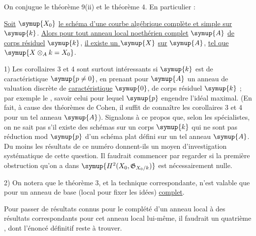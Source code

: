 On conjugue le théorème 9(ii) et le théorème 4. En particulier :

 \uline{Soit} $\symup{X_0}$ \uline{le schéma d'une courbe algébrique complète
et simple sur} $\symup{k}$. \uline{Alors pour tout anneau local noethérien complet} $\symup{A}$ \uline{de corps
résiduel} $\symup{k}$, \uline{il existe un } $\symup{X}$ \uline{sur} $\symup{A}$, \uline{tel que}
$\symup{X\otimes_A k=X_0}$.


1) Les corollaires 3 et 4 sont surtout intéressants si $\symup{k}$ est de
caractéristique $\symup{p\ne0}$, en prenant pour $\symup{A}$ un anneau de valuation discrète de
\uline{caractéristique} $\symup{0}$, de corps résiduel $\symup{k}$ ; par exemple le , savoir celui pour lequel $\symup{p}$ engendre l'idéal maximal. (En fait, à
cause des théorèmes de Cohen, il suffit de connaître les corollaires 3 et 4
pour un tel anneau $\symup{A}$). Signalons à ce propos que, selon les spécialistes, on
ne sait pas s'il existe des schémas sur un corps $\symup{k}$ qui ne sont pas réduction
mod $\symup{p}$ d'un schéma plat défini sur un tel anneau $\symup{A}$. Du moins les résultats
de ce numéro donnent-ils un moyen d'investigation systématique de cette
question. Il faudrait commencer
par regarder si la première obstruction qu'on a dans
$\symup{H^2(X_0,\mathfrak G_{X_0/k})}$ est nécessairement nulle.

2) On notera que le théorème 3, et la technique correspondante, n'est valable
que pour un anneau de base (local pour fixer les idées) \uline{complet}.

Pour passer de résultats connus pour le complété d'un anneau local à des
résultats correspondants pour cet anneau local lui-même, il faudrait un
quatrième , dont l'énoncé définitif reste à trouver.

